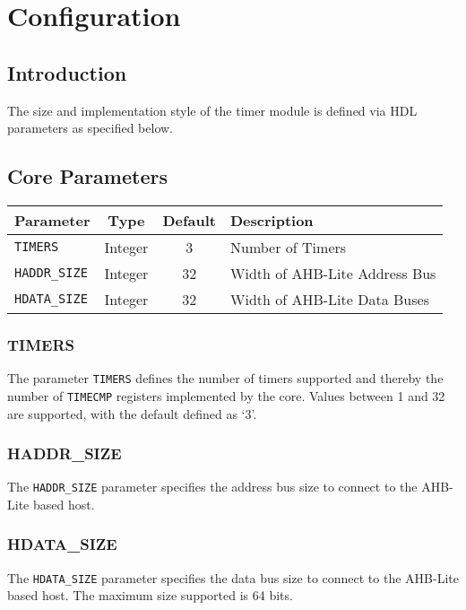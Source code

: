 \chapter{Configuration} \label{configurations}

\section{Introduction}\label{introduction-1}

The size and implementation style of the timer module is defined via HDL
parameters as specified below.

\section{Core Parameters}\label{core-parameters}

\begin{longtable}[]{@{}lccl@{}}
\toprule
Parameter & Type & Default & Description\tabularnewline
\midrule
\endhead
\texttt{TIMERS}      & Integer & 3  & Number of Timers\tabularnewline
\texttt{HADDR\_SIZE} & Integer & 32 & Width of AHB-Lite Address Bus\tabularnewline
\texttt{HDATA\_SIZE} & Integer & 32 & Width of AHB-Lite Data Buses\tabularnewline
\bottomrule
\end{longtable}

\subsection{TIMERS}\label{timers}

The parameter \texttt{\texttt{TIMERS}} defines the number of timers supported and thereby
the number of \texttt{TIMECMP} registers implemented by the core. Values between
1 and 32 are supported, with the default defined as `3'.

\subsection{HADDR\_SIZE}\label{haddr_size}

The \texttt{HADDR\_SIZE} parameter specifies the address bus size to connect to
the AHB-Lite based host.

\subsection{HDATA\_SIZE}\label{hdata_size}

The \texttt{HDATA\_SIZE} parameter specifies the data bus size to connect to the
AHB-Lite based host. The maximum size supported is 64 bits.

